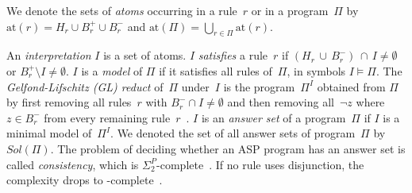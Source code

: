 \documentclass{svproc}
\newcommand{\Card}[1]{\left|#1\right|}
\newcommand{\SIGMA}[2]{\ensuremath{\Sigma_{\textrm{#1}}^{\textrm{#2}}}}
\newcommand{\sol}{$Sol(\Pi)$\xspace}
\begin{document}
%
%
We denote the sets of \emph{atoms} occurring in a rule~$r$ or in a
program~$\Pi$ by $\text{at}(r) = H_r \cup B^+_r \cup B^-_r$ and
$\text{at}(\Pi)= \bigcup_{r\in\Pi} \text{at}(r)$.
%
%
%
%
%
%
%

An \emph{interpretation} $I$ is a set of atoms. $I$ \emph{satisfies} a
rule~$r$ if $(H_r\,\cup\, B^-_r) \,\cap\, I \neq \emptyset$ or
$B^+_r \setminus I \neq \emptyset$.  $I$ is a \emph{model} of $\Pi$
if it satisfies all rules of~$\Pi$, in symbols $I \models \Pi$. %
%
%
The \emph{Gelfond-Lifschitz
  (GL) reduct} of~$\Pi$ under~$I$ is the program~$\Pi^I$ obtained
from $\Pi$ by first removing all rules~$r$ with
$B^-_r\cap I\neq \emptyset$ and then removing all~$\neg z$ where
$z \in B^-_r$ from every remaining
rule~$r$~\cite{GelfondLifschitz91}. %
%
$I$ is an \emph{answer set} of a program~$\Pi$ if $I$ is a minimal
model of~$\Pi^I$. %
We denoted the set of all answer sets of program~$\Pi$ by \sol.
%
The problem of deciding whether an ASP program has an answer set is called
\emph{consistency}, which is $\Sigma_2^P$-complete~\cite{EiterGottlob95}.
%
If no rule uses disjunction, the complexity drops to
-complete~\cite{BidoitFroidevaux91,MarekTruszczynski91}.
\end{document}
